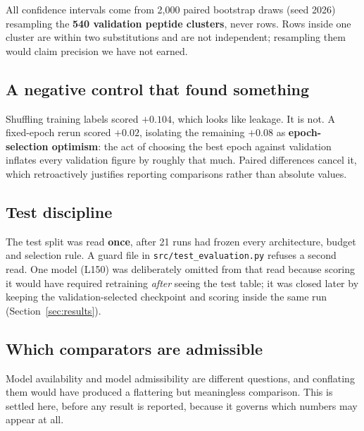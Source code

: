 \documentclass[11pt,a4paper]{article}
\begin{document}
All confidence intervals come from 2{,}000 paired bootstrap draws (seed 2026) resampling the
\textbf{540 validation peptide clusters}, never rows. Rows inside one cluster are within two
substitutions and are not independent; resampling them would claim precision we have not earned.

\subsection{A negative control that found something}

Shuffling training labels scored $+0.104$, which looks like leakage. It is not. A fixed-epoch
rerun scored $+0.02$, isolating the remaining $+0.08$ as \textbf{epoch-selection optimism}: the
act of choosing the best epoch against validation inflates every validation figure by roughly
that much. Paired differences cancel it, which retroactively justifies reporting comparisons
rather than absolute values.

\subsection{Test discipline}

The test split was read \textbf{once}, after 21 runs had frozen every architecture, budget and
selection rule. A guard file in \texttt{src/test\_evaluation.py} refuses a second read. One model
(L150) was deliberately omitted from that read because scoring it would have required retraining
\emph{after} seeing the test table; it was closed later by keeping the validation-selected
checkpoint and scoring inside the same run (Section~\ref{sec:results}).

\subsection{Which comparators are admissible}

Model availability and model admissibility are different questions, and conflating them would have
produced a flattering but meaningless comparison. This is settled here, before any result is
reported, because it governs which numbers may appear at all.
\end{document}
